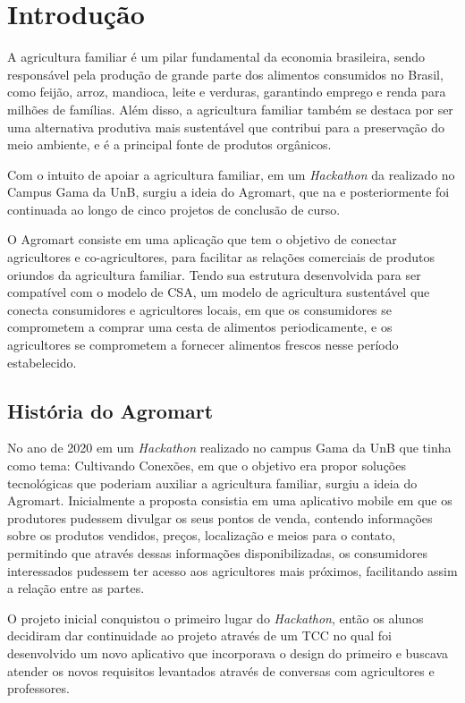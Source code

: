 \chapter[Introdução]{Introdução}

A agricultura familiar é um pilar fundamental da economia brasileira, sendo responsável pela produção de grande parte dos alimentos consumidos no Brasil, como feijão, arroz, mandioca, leite e verduras, garantindo emprego e renda para milhões de famílias. Além disso, a agricultura familiar também se destaca por ser uma alternativa produtiva mais sustentável que contribui para a preservação do meio ambiente, e é a principal fonte de produtos orgânicos.

Com o intuito de apoiar a agricultura familiar, em um \textit{Hackathon} da realizado no Campus Gama da UnB, surgiu a ideia do Agromart, que na  e posteriormente foi continuada ao longo de cinco projetos de conclusão de curso.

O Agromart consiste em uma aplicação que tem o objetivo de conectar agricultores e co-agricultores, para facilitar as relações comerciais de produtos oriundos da agricultura familiar. Tendo sua estrutura desenvolvida para ser compatível com o modelo de CSA, um modelo de agricultura sustentável que conecta consumidores e agricultores locais, em que os consumidores se comprometem a comprar uma cesta de alimentos periodicamente, e os agricultores se comprometem a fornecer alimentos frescos nesse período estabelecido.

\section{História do Agromart}

No ano de 2020 em um \textit{Hackathon} realizado no campus Gama  da UnB que tinha como tema: Cultivando Conexões, em que o objetivo era propor soluções tecnológicas que poderiam auxiliar a agricultura familiar, surgiu a ideia do Agromart. Inicialmente a proposta consistia em uma aplicativo mobile em que os produtores pudessem divulgar os seus pontos de venda, contendo informações sobre os produtos vendidos, preços, localização e meios para o contato, permitindo que através dessas informações disponibilizadas, os consumidores interessados pudessem ter acesso aos agricultores mais próximos, facilitando assim a relação entre as partes. \cite{rodriguesemacedo2021}

O projeto inicial conquistou o primeiro lugar do \textit{Hackathon}, então os alunos decidiram dar continuidade ao projeto através de um TCC no qual foi desenvolvido um novo aplicativo que incorporava o design do primeiro e buscava atender os novos requisitos levantados através de conversas com agricultores e professores. \cite{rodriguesemacedo2021}


